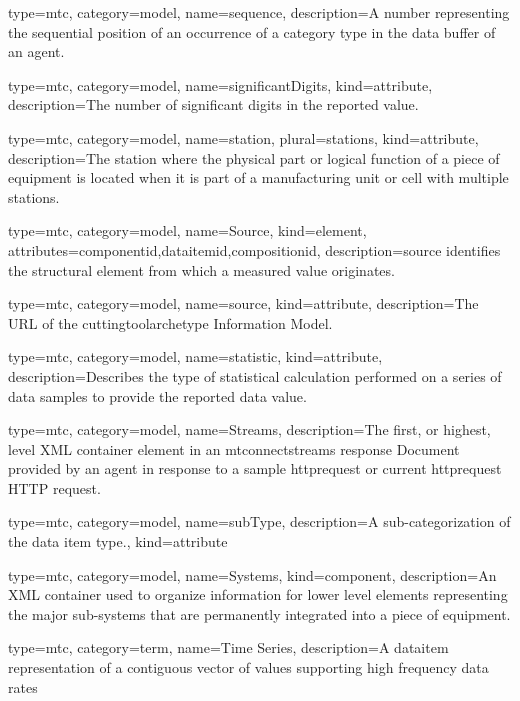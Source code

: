 {
  type=mtc,
  category=model,
  name={sequence},
  description={A number representing the sequential position of an occurrence of a \gls{category} type in the data buffer of an \gls{agent}. }
}


{
  type=mtc,
  category=model,
  name={significantDigits},
  kind={attribute},
  description={The number of significant digits in the reported value.}
}


{
  type=mtc,
  category=model,
  name={station},
  plural={stations},
  kind={attribute},
  description={The station where the physical part or logical function of a piece of equipment is located when it is part of a manufacturing unit or cell with multiple stations.}
}


{
  type=mtc,
  category=model,
  name={Source},
  kind={element},
  attributes={\gls{componentid},\gls{dataitemid},\gls{compositionid}},
  description={\gls{source} identifies the \gls{structural element} from which a measured value originates.}
}

{
  type=mtc,
  category=model,
  name={source},
  kind={attribute},
  description={The URL of the \gls{cuttingtoolarchetype} Information Model.}
}

{
  type=mtc,
  category=model,
  name={statistic},
  kind={attribute},
  description={Describes the type of statistical calculation performed on a series of data samples to provide the reported data value.}
}


{
  type=mtc,
  category=model,
  name={Streams},
  description={The first, or highest, level XML container element in an \gls{mtconnectstreams} \gls{response} Document provided by an \gls{agent} in response to a \gls{sample httprequest} or \gls{current httprequest} HTTP \gls{request}.}
}


{
  type=mtc,
  category=model,
  name={subType},
  description={A sub-categorization of the data item \gls{type}.},
  kind={attribute}
}

{
  type=mtc,
  category=model,
  name={Systems},
  kind={component},
  description={An XML container used to organize information for \gls{lower level} elements representing the major sub-systems that are permanently integrated into a piece of equipment.}
}


{
  type=mtc,
  category=term,
  name={Time Series},
  description={A \gls{dataitem} representation of a contiguous vector of values supporting high frequency data rates}
}


